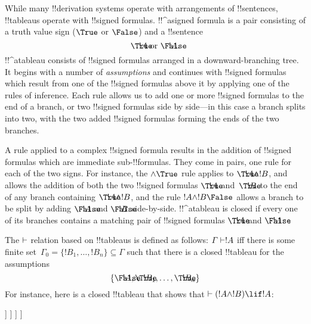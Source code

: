\documentclass[../../../include/open-logic-section]{subfiles}
\begin{document}


While many !!{derivation} systems operate with arrangements of
!!{sentence}s, !!{tableau}s operate with !!{signed formula}s.
!!^a{signed formula} is a pair consisting of a truth value sign
($\True$ or $\False$) and a !!{sentence}
\[
\sFmla{\True}{!A} \text{ or } \sFmla{\False}{!A}.
\]
!!^a{tableau} consists of !!{signed formula}s arranged in a
downward-branching tree. It begins with a number of \emph{assumptions}
and continues with !!{signed formula}s which result from one of the
!!{signed formula}s above it by applying one of the rules of
inference. Each rule allows us to add one or more !!{signed formula}s
to the end of a branch, or two !!{signed formula}s side by side---in
this case a branch splits into two, with the two added !!{signed
  formula}s forming the ends of the two branches.

A rule applied to a complex !!{signed formula} results in the addition
of !!{signed formula}s which are immediate sub-!!{formula}s. They come
in pairs, one rule for each of the two signs.  For instance, the
$\TRule{\True}{\land}$ rule applies to $\sFmla{\True}{!A \land !B}$,
and allows the addition of both the two !!{signed formula}s
$\sFmla{\True}{!A}$ and~$\sFmla{\True}{!B}$ to the end of any branch
containing $\sFmla{\True}{!A \land !B}$, and the rule
$\TRule{\False}{!A \land !B}$ allows a branch to be split by adding
$\sFmla{\False}{!A}$ and $\sFmla{\False}{!B}$ side-by-side.
!!^a{tableau} is closed if every one of its branches contains a
matching pair of !!{signed formula}s $\sFmla{\True}{!A}$ and
$\sFmla{\False}{!A}$.

The $\Proves$ relation based on !!{tableau}s is defined as follows:
$\Gamma \Proves !A$ iff there is some finite set~$\Gamma_0 = \{!B_1,
\dots, !B_n\} \subseteq \Gamma$ such that there is a closed !!{tableau}
for the assumptions
\[
\{\sFmla{\False}{!A}, \sFmla{\True}{!B_1}, \dots, \sFmla{\True}{!B_n}\} 
\]
For instance, here is a closed !!{tableau} that shows that $\Proves
(!A \land !B) \lif !A$:
\begin{oltableau}
  [\sFmla{\False}{(\formula{A} \land \formula{B}) \lif \formula{A}}, just = \TAss
    [\sFmla{\True}{\formula{A} \land \formula{B}}, just = {\TRule{\False}{\lif}[1]}
      [\sFmla{\False}{\formula{A}}, just = {\TRule{\False}{\lif}[1]}
        [\sFmla{\True}{\formula{A}}, just = {\TRule{\True}{\lif}[2]}
          [\sFmla{\True}{\formula{B}}, just = {\TRule{\True}{\lif}[2]}, close]
        ]
      ]
    ]
  ]
\end{oltableau}
\end{document}
